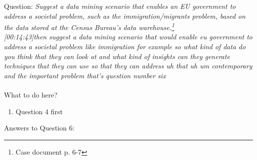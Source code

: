 Question:
\emph{
    Suggest a data mining scenario that enables an EU government to address a societal
problem, such as the immigration/migrants problem, based on the data stored at the
Census Bureau’s data warehouse.\footnote{Case document p. 6-7}
}\\

\emph{[00:14:43]then suggest a data mining scenario that would enable eu government
to address a societal problem like immigration for example so what kind of data do you think
that they can look at and what kind of insights can they generate techniques that they can use
so that they can address uh that uh um contemporary and the important problem that's question number
six}\\\\

What to do here?
\begin{enumerate}
    \item Question 4 first
  \end{enumerate}

\newpage Answers to Question 6:

